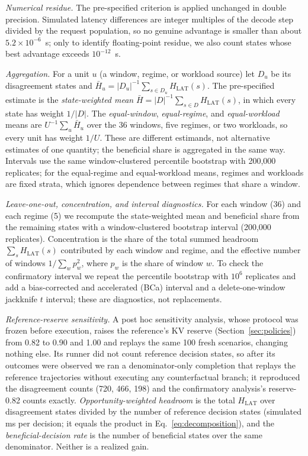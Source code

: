 \documentclass[preprint,12pt]{elsarticle}
\begin{document}
\emph{Numerical residue.} The pre-specified criterion is applied unchanged in
double precision. Simulated latency differences are integer multiples of the
decode step divided by the request population, so no genuine advantage is
smaller than about $5.2\times10^{-6}$~s; only to identify floating-point
residue, we also count states whose best advantage exceeds $10^{-12}$~s.

\emph{Aggregation.} For a unit $u$ (a window, regime, or workload source) let
$D_u$ be its disagreement states and
$\bar H_u=|D_u|^{-1}\sum_{s\in D_u}H_{\mathrm{LAT}}(s)$. The pre-specified
estimate is the \emph{state-weighted mean}
$\bar H=|D|^{-1}\sum_{s\in D}H_{\mathrm{LAT}}(s)$, in which every state has
weight $1/|D|$. The \emph{equal-window}, \emph{equal-regime}, and
\emph{equal-workload} means are $U^{-1}\sum_u\bar H_u$ over the 36 windows, five
regimes, or two workloads, so every unit has weight $1/U$. These are different
estimands, not alternative estimates of one quantity; the beneficial share is
aggregated in the same way. Intervals use the same window-clustered percentile
bootstrap with 200,000 replicates; for the equal-regime and equal-workload
means, regimes and workloads are fixed strata, which ignores dependence between
regimes that share a window.

\emph{Leave-one-out, concentration, and interval diagnostics.} For each window
(36) and each regime (5) we recompute the state-weighted mean and beneficial
share from the remaining states with a window-clustered bootstrap interval
(200,000 replicates). Concentration is the share of the total summed headroom
$\sum_sH_{\mathrm{LAT}}(s)$ contributed by each window and regime, and the
effective number of windows $1/\sum_wp_w^2$, where $p_w$ is the share of window
$w$. To check the confirmatory interval we repeat the percentile bootstrap with
$10^6$ replicates and add a bias-corrected and accelerated (BCa) interval and a
delete-one-window jackknife $t$ interval; these are diagnostics, not
replacements.

\emph{Reference-reserve sensitivity.} A post hoc sensitivity analysis, whose
protocol was frozen before execution, raises the reference's KV reserve
(Section~\ref{sec:policies}) from 0.82 to 0.90 and 1.00 and replays the same 100
fresh scenarios, changing nothing else. Its runner did not count reference
decision states, so after its outcomes were observed we ran a denominator-only
completion that replays the reference trajectories without executing any
counterfactual branch; it reproduced the disagreement counts (720, 466, 198) and
the confirmatory analysis's reserve-0.82 counts exactly. \emph{Opportunity-weighted
headroom} is the total $H_{\mathrm{LAT}}$ over disagreement states divided by the
number of reference decision states (simulated ms per decision; it equals the
product in Eq.~\ref{eq:decomposition}), and the
\emph{beneficial-decision rate} is the number of beneficial states over the same
denominator. Neither is a realized gain.
\end{document}

